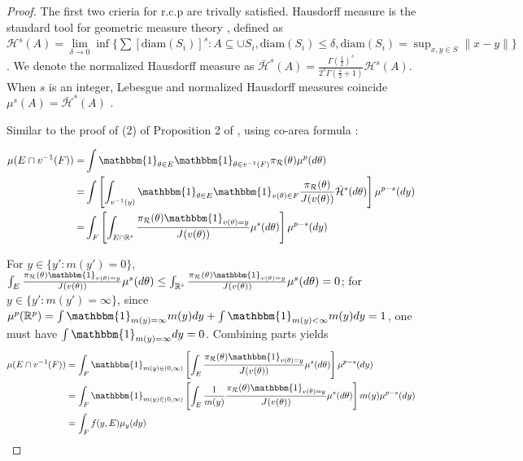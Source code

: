 \documentclass[10pt,fleqn]{article}
\newcommand{\be}{\begin{equation}\begin{aligned}}
\newcommand{\ee}{\end{aligned}\end{equation}}
\newcommand{\bb}[1]{\mathbb{#1}}
\newcommand{\mc}[1]{\mathcal{#1}}
\DeclareMathOperator{\1}{\mathbbm{1}}
\begin{document}
\begin{proof} The first two crieria for r.c.p are trivally satisfied. Hausdorff measure is the standard tool for geometric measure theory \citep{federer2014geometric}, defined as $\mc H^{s}(A)= \underset{\delta\rightarrow 0}\lim \inf \{ \sum \left[{\text{diam}(S_i)}\right]^s: {A\subseteq \cup S_i, \text{diam}(S_i)\le \delta}, \text{diam}(S_i)=\sup_{x,y\in S}\|x-y\|\}$. We denote the normalized Hausdorff measure as $\bar{\mc H}^{s}(A) =\frac{\Gamma(\frac{1}{2})^{s}}{2^s \Gamma(\frac{s}{2}+1)} \mc H^{s}(A)$. When $s$ is an integer, Lebesgue and normalized Hausdorff measures coincide  $\mu^{s}(A)= \bar{\mc H}^{s}(A)$ \citep{evans2015measure}.

Similar to the proof of (2) of Proposition 2 of \cite{diaconis2013manifold}, using co-area formula \citep{federer2014geometric}:

\be
\mu(E\cap v^{-1}(F))= & \int \mathbbm{1}_{\theta \in E} \mathbbm{1}_{\theta \in v^{-1}(F)}\pi_{\mc R}(\theta)\mu^p(d\theta) \\
= & \int \left[ \int_{v^{-1}(y)} \mathbbm{1}_{\theta \in E} \mathbbm{1}_{v(\theta) \in F}  \frac{ \pi_{\mc R}(\theta)}{J(v(\theta))} \bar{\mc H}^{s}(d\theta)\right] \mu^{p-s}(dy) \\
= & \int_{F} \left [ \int_{ E \cap \bb R^{s}}  \frac{ \pi_{\mc R}(\theta) \mathbbm{1}_{v(\theta)=y}}{J(v(\theta))} \mu^{s}(d\theta)  \right] \mu^{p-s}(dy) \\
\ee


For $y\in \{y':m(y')=0\}$, $\int_{ E}  \frac{ \pi_{\mc R}(\theta) \mathbbm{1}_{v(\theta)=y}}{J(v(\theta))} \mu^s(d\theta) \le \int_{ \bb R^{s}}  \frac{ \pi_{\mc R}(\theta) \mathbbm{1}_{v(\theta)=y}}{J(v(\theta))} \mu^s(d\theta) =0$; for $y\in \{y':m(y')=\infty\}$, since $\mu ^{p}(\bb R^p)=\int \mathbbm{1}_{m(y)=\infty}m(y) dy + \int  \mathbbm{1}_{m(y)<\infty}m(y)  dy=1$, one must have $\int \mathbbm{1}_{m(y)=\infty} dy=0$. Combining parts yields
\be
\mu(E\cap v^{-1}(F)) & = \int_{F} \mathbbm{1}_{m(y)\in (0,\infty)}\left[
\int_{E} \frac{\pi_{\mc
R}(\theta) \mathbbm{1}_{v({\theta})=y}}{J(v(\theta))}
\mu^{s}(d\theta) \right] \mu^{p-s}(dy) \\
& = \int_{F} \mathbbm{1}_{m(y)\in (0,\infty)}
\left[ \int_{E}  \frac{1}{m(y)}  \frac{\pi_{\mc
R}(\theta) \mathbbm{1}_{v({\theta})=y}}{J(v(\theta))}
\mu^{s}(d\theta) \right ]  m(y)\mu^{p-s}(dy)\\
& =\int_F f(y,E) \mu_y(dy) 
\ee

\end{proof}
\end{document}
